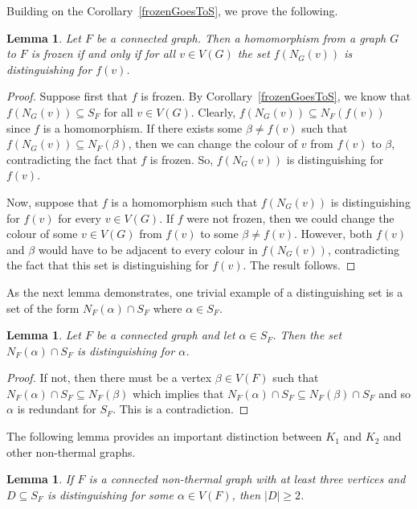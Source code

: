 \documentclass[11 pt]{amsart}
\newtheorem{lem}[equation]{Lemma}
\theoremstyle{definition}
\theoremstyle{case}
\numberwithin{equation}{section}
\begin{document}
Building on the Corollary~\ref{frozenGoesToS}, we prove the following. 

\begin{lem}
\label{distinguishingLem}
Let $F$ be a connected graph. Then a homomorphism from a graph $G$ to $F$ is frozen if and only if  for all $v\in V(G)$ the set $f(N_G(v))$ is distinguishing for $f(v)$.
\end{lem}

\begin{proof}
Suppose first that $f$ is frozen. By Corollary~\ref{frozenGoesToS}, we know that $f(N_G(v))\subseteq S_F$ for all $v\in V(G)$. Clearly, $f(N_G(v))\subseteq N_F(f(v))$ since $f$ is a homomorphism. If there exists some $\beta\neq f(v)$ such that $f(N_G(v))\subseteq N_F(\beta)$, then we can change the colour of $v$ from $f(v)$ to $\beta$, contradicting the fact that $f$ is frozen. So, $f(N_G(v))$ is distinguishing for $f(v)$. 

Now, suppose that $f$ is a homomorphism such that $f(N_G(v))$ is distinguishing for $f(v)$ for every $v\in V(G)$. If $f$ were not frozen, then we could change the colour of some $v\in V(G)$ from $f(v)$ to some $\beta\neq f(v)$. However, both $f(v)$ and $\beta$ would have to be adjacent to every colour in $f(N_G(v))$, contradicting the fact that this set is distinguishing for $f(v)$. The result follows. 
\end{proof}

As the next lemma demonstrates, one trivial example of a distinguishing set is a set of the form $N_F(\alpha)\cap S_F$ where $\alpha\in S_F$. 

\begin{lem}
\label{nbhdDistinguishes}
Let $F$ be a connected graph and let $\alpha\in S_F$. Then the set $N_F(\alpha)\cap S_F$ is distinguishing for $\alpha$.
\end{lem}

\begin{proof}
If not, then there must be a vertex $\beta\in V(F)$ such that $N_F(\alpha)\cap S_F\subseteq N_F(\beta)$ which implies that $N_F(\alpha)\cap S_F\subseteq N_F(\beta)\cap S_F$ and so $\alpha$ is redundant for $S_F$. This is a contradiction.
\end{proof}

The following lemma provides an important distinction between $K_1$ and $K_2$ and other non-thermal graphs. 

\begin{lem}
\label{notK1K2}
If $F$ is a connected non-thermal graph with at least three vertices and $D\subseteq S_F$ is distinguishing for some $\alpha\in V(F)$, then $|D|\geq2$. 
\end{lem}
\end{document}
